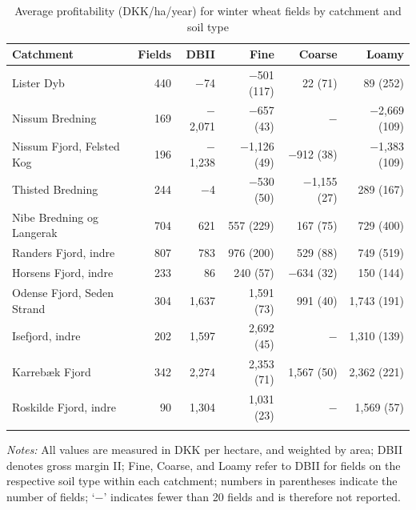 \documentclass[12pt]{article}
\begin{document}
\begin{table}[H]
\centering
\small
\caption{Average profitability (DKK/ha/year) for winter wheat fields by catchment and soil type}
\label{tab:dbii-vinterhvede}
\begin{threeparttable}
\begin{tabular}{lrrrrr}
\toprule
\textbf{Catchment} & \textbf{Fields} & \textbf{DBII} & \textbf{Fine} &
\textbf{Coarse} & \textbf{Loamy} \\
\midrule\addlinespace
Lister Dyb                 & 440 &  $-$74   & $-$501 (117)  &    22 (71)    &    89 (252) \\
Nissum Bredning            & 169 & $-$2,071 & $-$657 (43)   & $-$            & $-$2,669 (109) \\
Nissum Fjord, Felsted Kog  & 196 & $-$1,238 & $-$1,126 (49) & $-$912 (38)   & $-$1,383 (109) \\
Thisted Bredning           & 244 &   $-$4   & $-$530 (50)   & $-$1,155 (27) &    289 (167) \\
Nibe Bredning og Langerak  & 704 &   621    &   557 (229)   &   167 (75)    &    729 (400) \\
Randers Fjord, indre       & 807 &   783    &   976 (200)   &   529 (88)    &    749 (519) \\
Horsens Fjord, indre       & 233 &    86    &   240 (57)    & $-$634 (32)   &    150 (144) \\
Odense Fjord, Seden Strand & 304 & 1,637    & 1,591 (73)    &   991 (40)    & 1,743 (191) \\
Isefjord, indre            & 202 & 1,597    & 2,692 (45)    & $-$            & 1,310 (139) \\
Karrebæk Fjord             & 342 & 2,274    & 2,353 (71)    & 1,567 (50)    & 2,362 (221) \\
Roskilde Fjord, indre      &  90 & 1,304    & 1,031 (23)    & $-$            & 1,569 (57) \\
\addlinespace\bottomrule
\end{tabular}
\begin{tablenotes}
\footnotesize
\item \textit{Notes:} All values are measured in DKK per hectare, and weighted by area;
DBII denotes gross margin II; Fine, Coarse, and Loamy refer to DBII for fields on the
respective soil type within each catchment; numbers in parentheses indicate the number of
fields; `$-$' indicates fewer than 20 fields and is therefore not reported.
\end{tablenotes}
\end{threeparttable}
\end{table}
\end{document}
